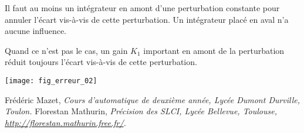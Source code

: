 \begin{resultat}
Il faut au moins un intégrateur en amont d'une perturbation constante pour
annuler l'écart vis-à-vis de cette perturbation. Un intégrateur placé en aval n'a aucune
influence.

Quand ce n'est pas le cas, un gain $K_1$ important en amont de la perturbation réduit toujours
l'écart vis-à-vis de cette perturbation.
\end{resultat}


\begin{center}
\texttt{[image: fig\_erreur\_02]}
\end{center}




\begin{thebibliography}{2}
    Frédéric Mazet, {\it Cours d'automatique de deuxième année, Lycée Dumont Durville, Toulon.}
       Florestan Mathurin, {\it Précision des SLCI, Lycée Bellevue, Toulouse, \url{http://florestan.mathurin.free.fr/}.}

\end{thebibliography}

%



